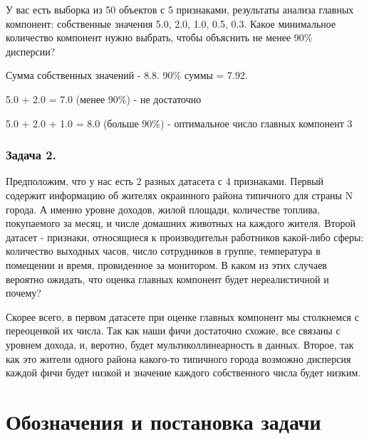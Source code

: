 У вас есть выборка из 50 объектов с 5 признаками, результаты анализа главных компонент: собственные значения 5.0, 2.0, 1.0, 0.5, 0.3. Какое минимальное количество компонент нужно выбрать, чтобы объяснить не менее 90\% дисперсии?

\begin{solution}
    Сумма собственных значений - 8.8. 90\% суммы = 7.92.

    5.0 + 2.0 = 7.0 (менее 90\%) - не достаточно

    5.0 + 2.0 + 1.0 = 8.0 (больше 90\%) - оптимальное число главных компонент 3
\end{solution}
\subsubsection*{Задача 2.}

Предположим, что у нас есть 2 разных датасета с 4 признаками. Первый содержит информацию об жителях окраинного района типичного для страны N города. А именно уровне доходов, жилой площади, количестве топлива, покупаемого за месяц, и числе домашних животных на каждого жителя. Второй датасет - признаки, относящиеся к производительн работников какой-либо сферы: количество выходных часов, число сотрудников в группе, температура в помещении и время, провиденное за монитором. В каком из этих случаев вероятно ожидать, что оценка главных компонент будет нереалистичной и почему?

\begin{solution}
    Скорее всего, в первом датасете при оценке главных компонент мы столкнемся с переоценкой их числа. Так как наши фичи достаточно схожие, все связаны с уровнем дохода, и, веротно, будет мультиколлинеарность в данных. Второе, так как это жители одного района какого-то типичного города возможно дисперсия каждой фичи будет низкой и значение каждого собственного числа будет низким.
\end{solution}


\section{Обозначения и постановка задачи}

